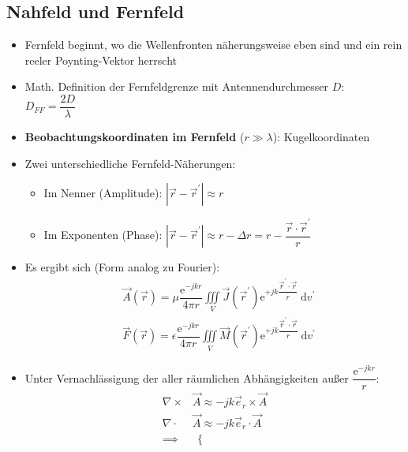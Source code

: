{\subsection{Nahfeld und Fernfeld}
\begin{itemize}
    \itemsep0pt
    \item Fernfeld beginnt, wo die Wellenfronten näherungsweise eben sind und ein rein reeler Poynting-Vektor herrscht
    \item Math. Definition der Fernfeldgrenze mit Antennendurchmesser $D$:\\
        \(D_{FF} = \dfrac{2D}{\lambda}\)
    \item \textbf{Beobachtungskoordinaten im Fernfeld} (\(r\gg\lambda\)): Kugelkoordinaten
    \item Zwei unterschiedliche Fernfeld-Näherungen:\\
        \begin{itemize}
        \itemsep0pt
        \item Im Nenner (Amplitude): \(|\vec{r} - \vec{r}^\prime| \approx r\)
        \item Im Exponenten (Phase): \(|\vec{r} - \vec{r}^\prime| \approx r - \Delta r = r - \dfrac{\vec{r} \cdot \vec{r}^\prime}{r}\)
        \end{itemize}
    \item Es ergibt sich (Form analog zu Fourier):\\
            \begin{align*}
                &\vec{A}(\vec{r}) = \mu\dfrac{\mathrm{e}^{-jkr}}{4\pi r} \iiint\limits_V \vec{J}(\vec{r}^\prime) \mathrm{e}^{+jk\dfrac{\vec{r}^\prime \cdot \vec{r}}{r}} \:\mathrm{d}v^\prime\\
                &\vec{F}(\vec{r}) = \epsilon\dfrac{\mathrm{e}^{-jkr}}{4\pi r} \iiint\limits_V \vec{M}(\vec{r}^\prime) \mathrm{e}^{+jk\dfrac{\vec{r}^\prime \cdot \vec{r}}{r}} \:\mathrm{d}v^\prime
            \end{align*}
        \item Unter Vernachlässigung der aller räumlichen Abhängigkeiten außer $\dfrac{\mathrm{e}^{-jkr}}{r}$:\\
            \begin{align*}
                \nabla\times&\vec{A} \approx -jk\vec{e}_r\times\vec{A}\\
                \nabla\cdot&\vec{A} \approx -jk\vec{e}_r\cdot\vec{A}\\
                \implies&\
                \begin{cases}%

\end{cases}
\end{align*}
\end{itemize}}
